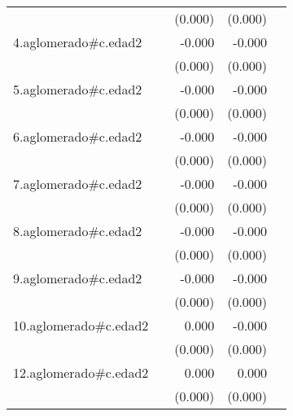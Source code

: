 {\begin{longtable}{l*{4}{D{.}{.}{-1}}}
            &                     &     (0.000)         &     (0.000)         &                     \\
\addlinespace
4.aglomerado#c.edad2&                     &      -0.000         &      -0.000\sym{**} &                     \\
            &                     &     (0.000)         &     (0.000)         &                     \\
\addlinespace
5.aglomerado#c.edad2&                     &      -0.000         &      -0.000         &                     \\
            &                     &     (0.000)         &     (0.000)         &                     \\
\addlinespace
6.aglomerado#c.edad2&                     &      -0.000         &      -0.000\sym{***}&                     \\
            &                     &     (0.000)         &     (0.000)         &                     \\
\addlinespace
7.aglomerado#c.edad2&                     &      -0.000         &      -0.000         &                     \\
            &                     &     (0.000)         &     (0.000)         &                     \\
\addlinespace
8.aglomerado#c.edad2&                     &      -0.000         &      -0.000         &                     \\
            &                     &     (0.000)         &     (0.000)         &                     \\
\addlinespace
9.aglomerado#c.edad2&                     &      -0.000         &      -0.000\sym{**} &                     \\
            &                     &     (0.000)         &     (0.000)         &                     \\
\addlinespace
10.aglomerado#c.edad2&                     &       0.000         &      -0.000         &                     \\
            &                     &     (0.000)         &     (0.000)         &                     \\
\addlinespace
12.aglomerado#c.edad2&                     &       0.000\sym{*}  &       0.000         &                     \\
            &                     &     (0.000)         &     (0.000)         &                     \\

\end{longtable}}
